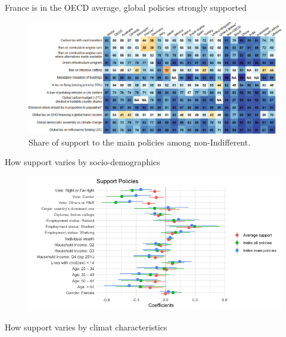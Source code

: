 \begin{framefont}{\small}
\begin{frame}{France is in the OECD average, global policies strongly supported}
	\begin{figure}[h!]
		\centering		
		\caption{Share of support to the main policies among non-Indifferent.}
		\includegraphics[width=\textwidth]{../figures/country_comparison/main_policies_share_countries.png}
		\end{figure}
\end{frame}

\begin{frame}{How support varies by socio-demographics}

\begin{figure}
	\includegraphics[width=.9\paperwidth]{../figures/FR/reg_support_policies_A_FR.png}
\end{figure}
\end{frame}

\begin{frame}{How support varies by climat characteristics}


\end{frame}
\end{framefont}
